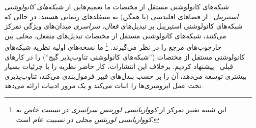 شبکه‌های کانولوشنی مستقل از مختصات ما تعمیم‌هایی از \emph{شبکه‌های کانولوشنی استیریبل}~\cite{Cohen2017-STEER,3d_steerableCNNs,Weiler2019_E2CNN,Cohen2019-generaltheory,lang2020WignerEckart} از فضاهای اقلیدسی (یا همگن) به منیفلدهای ریمانی هستند.
در حالی که شبکه‌های کانولوشنی استیریبل بر تبدیل‌های \emph{فعال، سراسری} میدان‌های ویژگی تمرکز می‌کنند، شبکه‌های کانولوشنی مستقل از مختصات تبدیل‌های \emph{منفعل، محلی} بین چارچوب‌های مرجع را در نظر می‌گیرند.%
\footnote{
	این شبیه تغییر تمرکز از \emph{کوواریانسی لورنتس سراسری} در \emph{نسبیت خاص} به \emph{کوواریانسی لورنتس محلی} در \emph{نسبیت عام} است.
}
ما نسخه‌های اولیه نظریه شبکه‌های کانولوشنی مستقل از مختصات (''شبکه‌های کانولوشنی تناوب‌پذیر گیج'') را در کارهای قبلی~\cite{gaugeIco2019,deHaan2020meshCNNs} پیشنهاد کردیم.
برخلاف این انتشارات، کار حاضر نظریه را با جزئیات بسیار بیشتری توسعه می‌دهد، آن را بر حسب بندل‌های فیبر فرمول‌بندی می‌کند، تناوب‌پذیری تحت عمل ایزومتری‌ها را اثبات می‌کند و یک مرور ادبیات ارائه می‌دهد.
